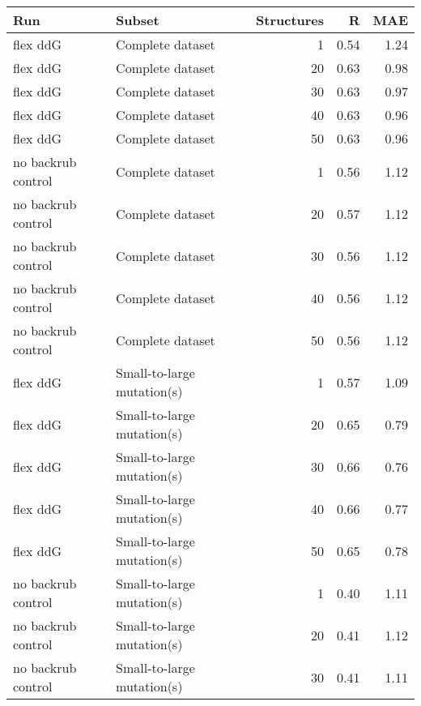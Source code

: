 \begin{table}
\begin{tabular}{llrrr}
\toprule
                Run &                               Subset &  Structures &    R &  MAE \\
\midrule
           flex ddG &                     Complete dataset &           1 & 0.54 & 1.24 \\
           flex ddG &                     Complete dataset &          20 & 0.63 & 0.98 \\
           flex ddG &                     Complete dataset &          30 & 0.63 & 0.97 \\
           flex ddG &                     Complete dataset &          40 & 0.63 & 0.96 \\
           flex ddG &                     Complete dataset &          50 & 0.63 & 0.96 \\
 no backrub control &                     Complete dataset &           1 & 0.56 & 1.12 \\
 no backrub control &                     Complete dataset &          20 & 0.57 & 1.12 \\
 no backrub control &                     Complete dataset &          30 & 0.56 & 1.12 \\
 no backrub control &                     Complete dataset &          40 & 0.56 & 1.12 \\
 no backrub control &                     Complete dataset &          50 & 0.56 & 1.12 \\
           flex ddG &           Small-to-large mutation(s) &           1 & 0.57 & 1.09 \\
           flex ddG &           Small-to-large mutation(s) &          20 & 0.65 & 0.79 \\
           flex ddG &           Small-to-large mutation(s) &          30 & 0.66 & 0.76 \\
           flex ddG &           Small-to-large mutation(s) &          40 & 0.66 & 0.77 \\
           flex ddG &           Small-to-large mutation(s) &          50 & 0.65 & 0.78 \\
 no backrub control &           Small-to-large mutation(s) &           1 & 0.40 & 1.11 \\
 no backrub control &           Small-to-large mutation(s) &          20 & 0.41 & 1.12 \\
 no backrub control &           Small-to-large mutation(s) &          30 & 0.41 & 1.11 \\

\end{tabular}
\end{table}
